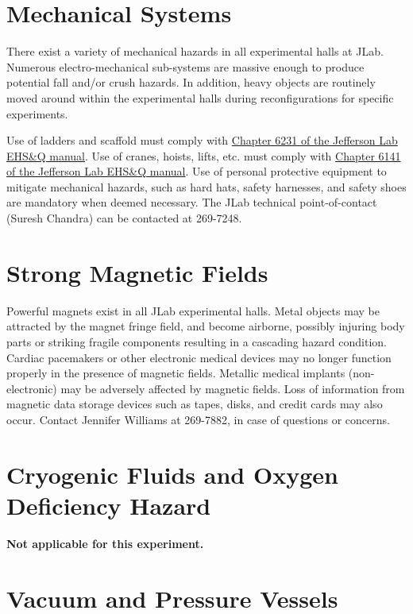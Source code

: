 \documentclass[11pt]{report}
\begin{document}
\section{Mechanical Systems}

	There exist a variety of mechanical hazards in all experimental halls at JLab. 
Numerous electro-mechanical sub-systems are massive enough to produce potential fall 
and/or crush hazards.  In addition, heavy objects are routinely moved around within 
the experimental halls during reconfigurations for specific experiments. 

Use of ladders and scaffold must comply 
with \href{http://www.jlab.org/ehs/ehsmanual/manual/6132.html}{Chapter 6231 of the 
Jefferson Lab EHS\&Q manual}.
Use of cranes, hoists, lifts, etc. must comply with
\href{http://www.jlab.org/ehs/ehsmanual/manual/6141.html}{Chapter 6141 of the 
Jefferson Lab EHS\&Q manual}. 
Use of personal protective equipment 
to mitigate mechanical hazards, such as hard hats, safety harnesses, and safety 
shoes are mandatory when deemed necessary.
The JLab technical point-of-contact (Suresh Chandra) can be contacted at 269-7248.

\section{Strong Magnetic Fields}

	Powerful magnets exist in all JLab experimental halls. Metal objects may be attracted 
by the magnet fringe field, and become airborne, possibly injuring body parts or striking 
fragile components resulting in a cascading hazard condition. Cardiac pacemakers or other 
electronic medical devices may no longer function properly in the presence of magnetic fields. 
Metallic medical implants (non-electronic) may be adversely affected by magnetic fields. Loss of 
information from magnetic data storage devices such as tapes, disks, and credit cards may also occur. 
Contact Jennifer Williams at 269-7882, in case of questions or concerns.

\section{Cryogenic Fluids and Oxygen Deficiency Hazard}

	{\bf Not applicable for this experiment.}

\section{Vacuum and Pressure Vessels}
\end{document}

